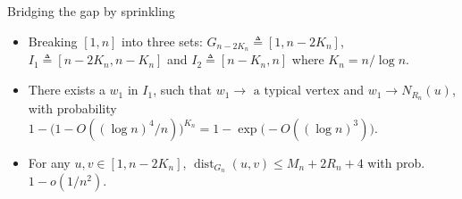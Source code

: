 \documentclass{beamer}
\theoremstyle{plain}
\theoremstyle{definition}
\begin{document}
\begin{frame}{Bridging the gap by sprinkling}
\footnotesize
    \begin{itemize}
        \item Breaking $[1 ,n]$ into three sets: $G_{n-2K_n}\triangleq [1,n-2K_n]$, $I_1\triangleq [n-2K_n,n-K_n]$ and $I_2\triangleq [n-K_n,n]$ where $K_n=n/\log n$.
        \item There exists a $w_1$ in $I_1$, such that $w_1\to \text{ a typical vertex}$ and $w_1\to N_{R_n}(u)$, with probability
           $
             	1-\big(1-O((\log n)^4/n)\big)^{K_n} = 1-\exp\big(-O((\log n)^3)\big)
            $.
          \item  For any $u,v \in [1,n-2K_n]$, $\operatorname{dist}_{G_n}(u,v)\leq M_n+2R_n+4$ with prob. $1-o(1/n^2)$.
                
    \end{itemize}
    
    \vspace{2mm}
    \centering
    

\end{frame}
\end{document}
